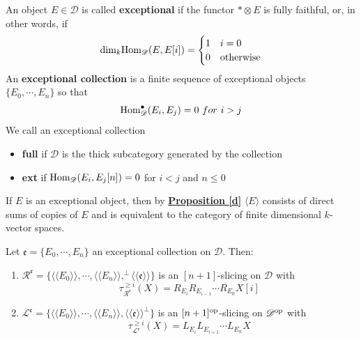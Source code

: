 \begin{defn} 
An object $E \in \mathscr{D}$ is called \textbf{exceptional} if the functor $* \otimes E$ is fully faithful, or, in other words, if $$\textnormal{dim}_k\textnormal{Hom}_{\mathscr{D}}(E,E[i])=\begin{cases} 1 & i=0 \\ 0 & \textnormal{otherwise} \end{cases}$$ An \textbf{exceptional collection} is a finite sequence of exceptional objects $\{ E_0, \cdots , E_n \}$ so that $$\textnormal{Hom}^{\bullet}_{\mathscr{D}}(E_i,E_j)=0 \  for \ i>j$$
We call an exceptional collection 
\begin{itemize}
\item \textbf{full} if $\mathscr{D}$ is the thick subcategory generated by the collection
\item \textbf{ext} if $\textnormal{Hom}_{\mathscr{D}}(E_i,E_j[n])=0$ for $i<j$ and $n \le 0$
\end{itemize}
\end{defn}

If $E$ is an exceptional object, then by \hyperref[d]{\textbf{Proposition \ref*{d}}} $\langle E \rangle$ consists of direct sums of copies of $E$ and is equivalent to the category of finite dimensional $k$-vector spaces.  \\

\begin{prop}\label{mim}
Let $\mathfrak{e}=\{  E_0, \cdots , E_n \}$ an exceptional collection on $\mathscr{D}$. Then:
\begin{enumerate}
\item $\mathscr{R}^{\mathfrak{e}}=\{ \langle \langle E_0 \rangle \rangle , \cdots , \langle \langle E_n \rangle \rangle, ^{\perp}\langle \langle \mathfrak{e} \rangle \rangle \}$ is an $[n+1]$-slicing on $\mathscr{D}$ with $$\tau_{\mathscr{R}^{\mathfrak{e}}}^{\ge i}(X)=R_{E_i}R_{E_{i-1}} \cdots R_{E_0}X[i]$$
\item  $\mathscr{L}^{\mathfrak{e}}=\{ \langle \langle E_0 \rangle \rangle , \cdots , \langle \langle E_n \rangle \rangle, \langle \langle \mathfrak{e} \rangle \rangle ^{\perp}\}$ is an $[n+1]^{\textnormal{op}}$-slicing on $\mathscr{D}^{\textnormal{op}}$ with $$\tau_{\mathscr{L}^{\mathfrak{e}}}^{\ge i}(X)=L_{E_i}L_{E_{i+1}} \cdots L_{E_n}X$$
\end{enumerate}
\end{prop}

